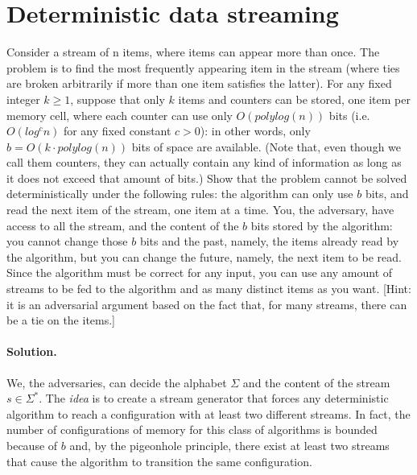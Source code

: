 \section{Deterministic data streaming}

Consider a stream of n items, where items can appear more than once. The problem is to find the most frequently appearing item in the stream (where ties are broken arbitrarily if more than one item satisfies the latter). For any fixed integer $k \geq 1$, suppose that only $k$ items and counters can be stored, one item per memory cell, where each counter can use only $O(polylog(n))$ bits (i.e. $O(log^c n)$ for any fixed constant $c > 0$): in other words, only $b = O(k\cdot polylog(n))$ bits of space are available. (Note that, even though we call them counters, they can actually contain any kind of information as long as it does not exceed that amount of bits.)
Show that the problem cannot be solved deterministically under the following rules: the algorithm can only use $b$ bits, and read the next item of the stream, one item at a time. You, the adversary, have access to all the stream, and the content of the $b$ bits stored by the algorithm: you cannot change those $b$ bits and the past, namely, the items already read by the algorithm, but you can change the future, namely, the next item to be read. Since the algorithm must be correct for any input, you can use any amount of streams to be fed to the algorithm and as many distinct items as you want. [Hint: it is an adversarial argument based on the fact that, for many streams, there can be a tie on the items.]

\vspace{0.5cm}
\paragraph{Solution.} We, the adversaries, can decide the alphabet $\Sigma$ and the content of the stream $s\in \Sigma^*$. The \emph{idea} is to create a stream generator that forces any deterministic algorithm to reach a configuration with at least two different streams. In fact, the number of configurations of memory for this class of algorithms is bounded because of $b$ and, by the pigeonhole principle, there exist at least two streams that cause the algorithm to transition the same configuration.

